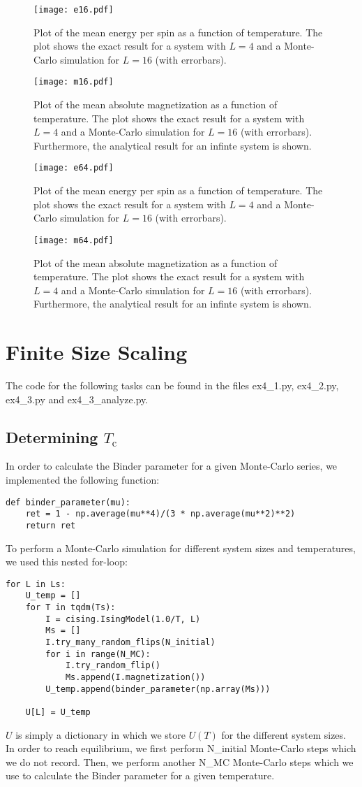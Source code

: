 \documentclass[a4paper,10pt,bibtotoc]{scrartcl}
\begin{document}
\begin{figure}[H]
	\centering
	\texttt{[image: e16.pdf]}
	\caption{Plot of the mean energy per spin as a function of temperature. The plot shows the exact result for a system with $L=4$ and a Monte-Carlo simulation for $L=16$ (with errorbars).}
	\label{fig:figex3_1}
	\texttt{[image: m16.pdf]}
	\caption{Plot of the mean absolute magnetization as a function of temperature. The plot shows the exact result for a system with $L=4$ and a Monte-Carlo simulation for $L=16$ (with errorbars). Furthermore, the analytical result for an infinte system is shown.}
	\label{fig:figex3_2}
\end{figure}

\begin{figure}[H]
	\centering
	\texttt{[image: e64.pdf]}
	\caption{Plot of the mean energy per spin as a function of temperature. The plot shows the exact result for a system with $L=4$ and a Monte-Carlo simulation for $L=16$ (with errorbars).}
	\label{fig:figex3_3}
	\texttt{[image: m64.pdf]}
	\caption{Plot of the mean absolute magnetization as a function of temperature. The plot shows the exact result for a system with $L=4$ and a Monte-Carlo simulation for $L=16$ (with errorbars). Furthermore, the analytical result for an infinte system is shown.}
	\label{fig:figex3_4}
\end{figure}

\newpage
\section{Finite Size Scaling}
The code for the following tasks can be found in the files ex4\_1.py, ex4\_2.py, ex4\_3.py and ex4\_3\_analyze.py.
\subsection{Determining $T_\mathrm{c}$}
In order to calculate the Binder parameter for a given Monte-Carlo series, we implemented the following function:
\begin{lstlisting}
def binder_parameter(mu):
    ret = 1 - np.average(mu**4)/(3 * np.average(mu**2)**2)
    return ret
\end{lstlisting}
To perform a Monte-Carlo simulation for different system sizes and temperatures, we used this nested for-loop:
\begin{lstlisting}
for L in Ls:
    U_temp = []
    for T in tqdm(Ts):
        I = cising.IsingModel(1.0/T, L)
        Ms = []
        I.try_many_random_flips(N_initial)
        for i in range(N_MC):
            I.try_random_flip()
            Ms.append(I.magnetization())
        U_temp.append(binder_parameter(np.array(Ms)))
        
    U[L] = U_temp
\end{lstlisting}
$U$ is simply a dictionary in which we store $U(T)$ for the different system sizes. 
In order to reach equilibrium, we first perform N\_initial Monte-Carlo steps which we do not record.
Then, we perform another N\_MC Monte-Carlo steps which we use to calculate the Binder parameter for a given temperature.
\end{document}

